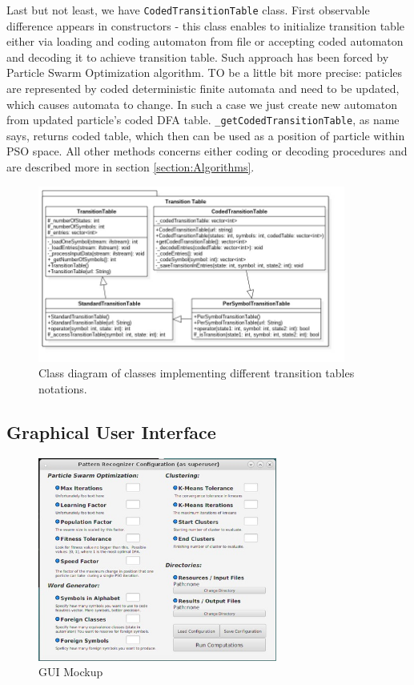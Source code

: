 \documentclass{article}
\begin{document}
Last but not least, we have \texttt{CodedTransitionTable} class. First observable difference appears in constructors - this class enables to initialize transition table either via loading and coding automaton from file or accepting coded automaton and decoding it to achieve transition table. Such approach has been forced by Particle Swarm Optimization algorithm. TO be a little bit more precise: paticles are represented by coded deterministic finite automata and need to be updated, which causes automata to change. In such a case we just create new automaton from updated particle's coded DFA table. \texttt{\_getCodedTransitionTable}, as name says, returns coded table, which then can be used as a position of particle within PSO space. All other methods concerns either coding or decoding procedures and are described more in section \ref{section:Algorithms}.




\begin{figure}[H]
	\centering
	\includegraphics[width=0.9\textwidth]{images/transition_table.jpg}
    \caption{Class diagram of classes implementing different transition tables notations.}
    \label{fig:trans_table_class}
\end{figure}


%
%
\newpage
\subsection{Graphical User Interface}
\begin{figure}
  \begin{center}
    \includegraphics[width=0.7\textwidth]{images/mock_gui.jpg}
  \end{center}
  \caption{GUI Mockup}
  \label{fig:gui_look}
\end{figure}
\end{document}

